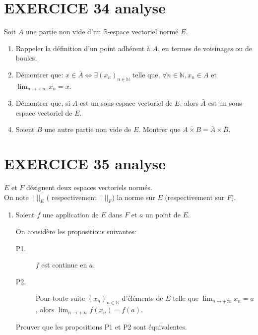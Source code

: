 \documentclass[10pt,oneside]{article}
\begin{document}
\begin{flushleft}
\begin{enumerate}
\end{enumerate}

\section*{EXERCICE 34 \:analyse }
  Soit $A$ une partie non vide d'un $\mathbb{R}$-espace vectoriel normé $E$.
\begin{enumerate}
\item
Rappeler la définition d'un point adhérent à $A$, en termes de voisinages ou de boules.
\item 
Démontrer que: $x\in\bar{A}\Longleftrightarrow\exists(x_n)_{n\in\mathbb N}$ telle que, $\forall n\in\mathbb{N}, x_n\in A$ et $\displaystyle\lim_{n\to+\infty}x_n=x$.


\item Démontrer que, si $A$ est un sous-espace vectoriel de $E$, alors $\bar{A}$ est un sous-espace vectoriel de $E$.

\item
Soient $B$ une autre partie non vide de $E$.
Montrer que $\overline{A\times B} = \bar{A}\times\bar{B}$.

\end{enumerate}


\section*{EXERCICE 35 \:analyse }



$E$ et $F$ désignent deux espaces vectoriels normés.\\
On note $||\:||_{E}$ ( respectivement $||\:||_{F}$) la norme sur $E$ (respectivement sur $F$).

\begin{enumerate}
\item Soient $f$ une application de $E$ dans $F$ et $a$ un point de $E$.

On considère les propositions suivantes:

\begin{description}
\item[P1.] $f$ est continue en $a$.
\item[P2.] Pour toute suite $(x_n)_{n\in\mathbb{N}}$ d'éléments de $E$ telle que $\displaystyle\lim_{n\to+\infty}x_n=a$, alors $\displaystyle\lim_{n\to+\infty}f(x_n)=f(a)$. 
\end{description}
Prouver que les propositions P1 et P2 sont équivalentes.


\end{enumerate}
\end{flushleft}
\end{document}
